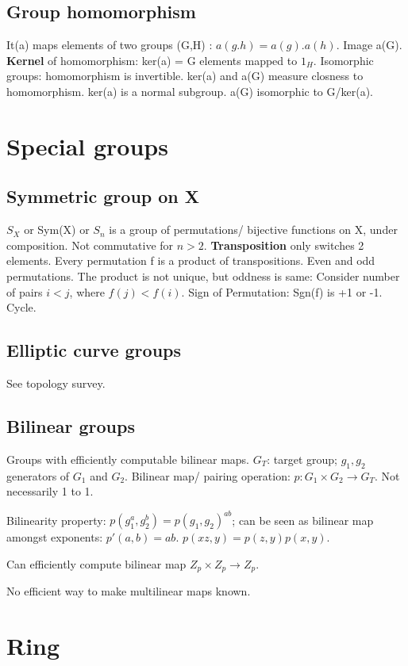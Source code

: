 \documentclass[oneside, article]{memoir}
\begin{document}
\section{Group homomorphism}
It(a) maps elements of two groups (G,H) : $a(g.h)=a(g).a(h)$. Image a(G). \textbf{Kernel} of homomorphism: ker(a) = G elements mapped to $1_{H}$. Isomorphic groups: homomorphism is invertible. ker(a) and a(G) measure closness to homomorphism. ker(a) is a normal subgroup. a(G) isomorphic to G/ker(a).

\chapter{Special groups}
\section{Symmetric group on X}
$S_{X}$ or Sym(X) or $S_{n}$ is a group of permutations/ bijective functions on X, under composition. Not commutative for $n>2$. \textbf{Transposition} only switches 2 elements. Every permutation f is a product of transpositions. Even and odd permutations. The product is not unique, but oddness is same: Consider number of pairs $i<j$, where $f(j)<f(i)$. Sign of Permutation: Sgn(f) is +1 or -1. Cycle.

\section{Elliptic curve groups}
See topology survey.

\section{Bilinear groups}
Groups with efficiently computable bilinear maps. $G_{T}$: target group; $g_{1}, g_{2}$ generators of $G_{1}$ and $G_{2}$. Bilinear map/ pairing operation: $p: G_1 \times G_2 \to G_{T}$. Not necessarily 1 to 1.

Bilinearity property: $p(g_{1}^{a}, g_{2}^{b}) = p(g_{1}, g_{2})^{ab}$; can be seen as bilinear map amongst exponents: $p'(a, b) = ab$. $p(xz,y) = p(z,y)p(x,y)$.

Can efficiently compute bilinear map $Z_{p} \times Z_{p} \to Z_{p}$. \why

No efficient way to make multilinear maps known.


\chapter{Ring}
\end{document}
